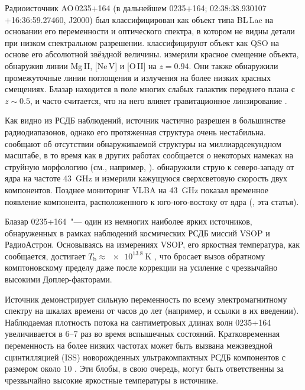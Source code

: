 Радиоисточник AO\,0235+164 (в дальнейшем 0235+164; 02:38:38.930107 +16:36:59.27460, J2000) был
классифицирован как объект типа BL\,Lac \cite{Spinrad_1975} на основании его переменности и
оптического спектра, в котором не видны детали при низком спектральном разрешении. \cite{Veron_2010}
классифицируют объект как QSO на основе его абсолютной звёздной величины. \cite{Cohen_1987} измерили
красное смещение объекта, обнаружив линии Mg\,II, [Ne\,V] и [O\,II] на $z = 0.94$. Они также
обнаружили промежуточные линии поглощения и излучения на более низких красных смещениях. Блазар
находится в поле многих слабых галактик переднего плана \cite{Burbidge_1996,Nilsson_1996} с $z \sim
0.5$, и часто считается, что на него влияет гравитационное линзирование
\cite{Stickel_1988,Abraham_1993,Webb_2000}.

Как видно из РСДБ наблюдений, источник частично разрешен в большинстве радиодиапазонов, однако его
протяженная структура очень нестабильна. \cite{Gabuzda_2000} сообщают об отсутствии обнаруживаемой
структуры на миллиардсекундном масштабе, в то время как в других работах сообщается о некоторых
намеках на струйную морфологию (см., например, \cite{Jones_1984,Altschuler_1995,Chu_1996}).
\cite{Jorstad_2001} обнаружили струю к северо-западу от ядра на частоте \SI{43}{\GHz} и измерили
кажущуюся сверхсветовую скорость двух компонентов. Позднее мониторинг VLBA на \SI{43}{\GHz} показал
временное появление компонента, расположенного к юго-юго-востоку от ядра (\cite{Agudo_2011}, эта
статья).

Блазар 0235+164~"--- один из немногих наиболее ярких источников, обнаруженных в рамках наблюдений
космических РСДБ миссий VSOP и РадиоАстрон. Основываясь на измерениях VSOP, его
яркостная температура, как сообщается, достигает $T_\text{b} \approx \SI{e13.8}{\kelvin}$
\cite{Frey_2000}, что бросает вызов обратному комптоновскому пределу даже после коррекции на
усиление с чрезвычайно высокими Доплер-факторами.

Источник демонстрирует сильную переменность по всему электромагнитному спектру на шкалах времени от
часов до лет (например, \cite{Ackermann_2012} и ссылки в их введении). Наблюдаемая плотность потока
на сантиметровых длинах волн 0235+164 увеличивается в 6--7 раз во время вспышечных состояний.
Кратковременная переменность на более низких частотах может быть вызвана межзвездной сцинтилляцией
(ISS) новорожденных ультракомпактных РСДБ компонентов с размером около \SI{10}{\uas}
\cite{Rickett_2006}. Эти блобы, в свою очередь, могут быть ответственны за чрезвычайно высокие
яркостные температуры в источнике.

